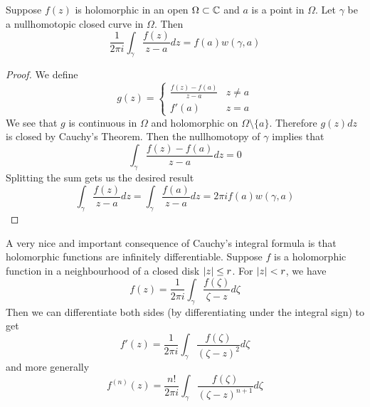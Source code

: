 \begin{theorem}
    Suppose $f(z)$ is holomorphic in an open $\Omega \subset \mathbb{C}$ and $a$ is a point in $\Omega$. Let $\gamma$ be a nullhomotopic closed curve in $\Omega$. Then
    $$\frac{1}{2\pi i}\int_\gamma \frac{f(z)}{z - a} dz = f(a) w(\gamma, a)$$
\end{theorem}
\begin{proof}
    We define
    $$g(z) = \begin{cases}
        \frac{f(z) - f(a)}{z - a} & z \neq a\\
        f'(a) & z = a
    \end{cases}$$
    We see that $g$ is continuous in $\Omega$ and holomorphic on $\Omega \setminus \{a\}$. Therefore $g(z) dz$ is closed by Cauchy's Theorem. Then the nullhomotopy of $\gamma$ implies that
    $$\int_\gamma \frac{f(z) - f(a)}{z - a} dz = 0$$
    Splitting the sum gets us the desired result
    $$\int_\gamma \frac{f(z)}{z - a} dz = \int_\gamma \frac{f(a)}{z - a} dz = 2\pi i f(a) w(\gamma, a)$$
    
\end{proof}

A very nice and important consequence of Cauchy's integral formula is that holomorphic functions are infinitely differentiable. Suppose $f$ is a holomorphic function in a neighbourhood of a closed disk $\left|z\right| \leq r$. For $\left|z\right| < r$, we have
$$f(z) = \frac{1}{2\pi i}\int_\gamma \frac{f(\zeta)}{\zeta - z} d\zeta$$
Then we can differentiate both sides (by differentiating under the integral sign) to get
$$f'(z) = \frac{1}{2\pi i}\int_\gamma \frac{f(\zeta)}{(\zeta - z)^2} d\zeta$$
and more generally
$$f^{(n)}(z) = \frac{n!}{2\pi i} \int_\gamma \frac{f(\zeta)}{(\zeta - z)^{n + 1}} d\zeta$$

